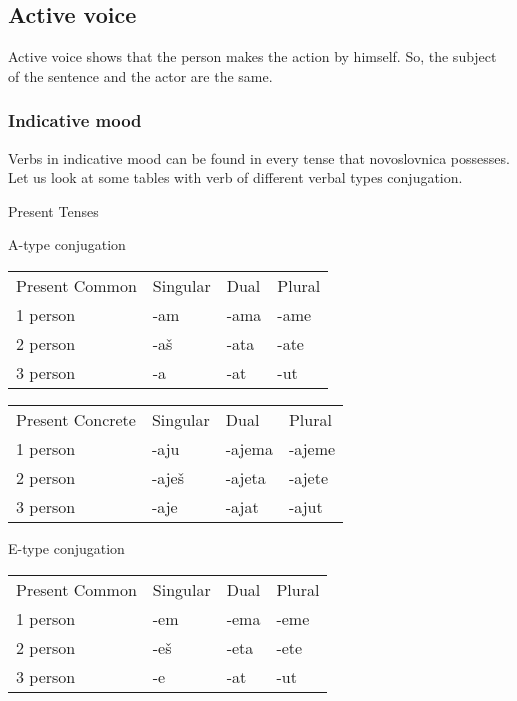 \subsection{Active voice}

Active voice shows that the person makes the action by himself. So, the subject of the sentence and the actor are the same.

\subsubsection{Indicative mood}

Verbs in indicative mood can be found in every tense that novoslovnica possesses. Let us look at some tables with verb of different verbal types conjugation.

Present Tenses

A-type conjugation

\begin{table}[h]
	\begin{tabular}{llll}
		Present Common & Singular & Dual & Plural \\
		1 person & -am & -ama & -ame \\
		2 person & -aš & -ata & -ate \\
		3 person & -a & -at & -ut
	\end{tabular}
\end{table}


\begin{table}[h]
	\begin{tabular}{llll}
		Present Concrete & Singular & Dual & Plural \\
		1 person & -aju & -ajema & -ajeme \\
		2 person & -aješ & -ajeta & -ajete \\
		3 person & -aje & -ajat & -ajut
	\end{tabular}
\end{table}

E-type conjugation

\begin{table}[h]
	\begin{tabular}{llll}
		Present Common & Singular & Dual & Plural \\
		1 person & -em & -ema & -eme \\
		2 person & -eš & -eta & -ete \\
		3 person & -e & -at & -ut
	\end{tabular}
\end{table}



